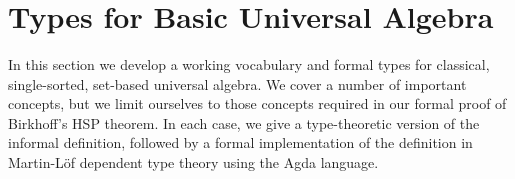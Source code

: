\begin{code}%
\>[0]\<%
\\
\>[0]\AgdaSpace{}%
\AgdaModule{\AgdaUnderscore{}}\AgdaSpace{}%
\AgdaSymbol{\{}\AgdaSpace{}%
\AgdaSymbol{:}\AgdaSpace{}%
\AgdaSpace{}%
\AgdaSpace{}%
\AgdaSymbol{\}\{}\AgdaSpace{}%
\AgdaSymbol{:}\AgdaSpace{}%
\AgdaSpace{}%
\AgdaSpace{}%
\AgdaSymbol{\}}\AgdaSpace{}%
\<%
\\
\>[0][@{}l@{\AgdaIndent{0}}]%
\>[1]\AgdaSpace{}%
\AgdaSpace{}%
\AgdaSpace{}%
\AgdaSpace{}%
\AgdaSymbol{()}\AgdaSpace{}%
\AgdaSpace{}%
\AgdaSymbol{(}\AgdaSpace{}%
\AgdaSpace{}%
\AgdaSpace{}%
\AgdaSpace{}%
\AgdaSymbol{)}\<%
\\
%
\\[\AgdaEmptyExtraSkip]%
%
\>[1]\AgdaSpace{}%
\AgdaSymbol{:}\AgdaSpace{}%
\AgdaSymbol{(}\AgdaSpace{}%
\AgdaSpace{}%
\AgdaSymbol{)}\AgdaSpace{}%
\AgdaSpace{}%
\AgdaSpace{}%
\AgdaSymbol{(}\AgdaSpace{}%
\AgdaSpace{}%
\AgdaSymbol{)}\AgdaSpace{}%
\<%
\\
%
\>[1]\AgdaSpace{}%
\AgdaSpace{}%
\AgdaSymbol{(}\AgdaSpace{}%
\AgdaOperator{\AgdaInductiveConstructor{,}}\AgdaSpace{}%
\AgdaSymbol{)}\AgdaSpace{}%
\AgdaSymbol{=}\AgdaSpace{}%
\AgdaSpace{}%
\AgdaSpace{}%
\AgdaSpace{}%
\AgdaSpace{}%
\AgdaSpace{}%
\AgdaSpace{}%
\AgdaSpace{}%
\AgdaSpace{}%
\AgdaSpace{}%
\AgdaSpace{}%
\AgdaSpace{}%
\AgdaSpace{}%
\AgdaSymbol{(}\AgdaSpace{}%
\AgdaSpace{}%
\AgdaSymbol{)}\<%
\end{code}



\section{Types for Basic Universal Algebra}
\label{types-for-basic-universal-algebra}
In this section we develop a working vocabulary and formal types for classical,
single-sorted, set-based universal algebra.
We cover a number of important concepts, but we limit ourselves to those
concepts required in our formal proof of Birkhoff's HSP theorem.
In each case, we give a type-theoretic version of the informal definition,
followed by a formal implementation of the definition in Martin-Löf dependent
type theory using the Agda language.

